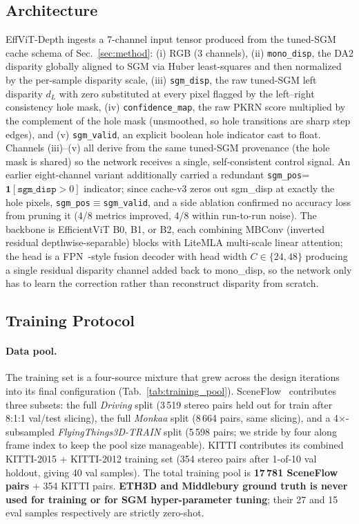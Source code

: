 \documentclass[journal]{IEEEtran}
\begin{document}
\subsection{Architecture}
\label{sec:effvit_arch}
EffViT-Depth ingests a 7-channel input tensor produced from the tuned-SGM cache schema of Sec.~\ref{sec:method}: (i) RGB (3 channels), (ii) \texttt{mono\_disp}, the DA2 disparity globally aligned to SGM via Huber least-squares and then normalized by the per-sample disparity scale, (iii) \texttt{sgm\_disp}, the raw tuned-SGM left disparity $d_L$ with zero substituted at every pixel flagged by the left--right consistency hole mask, (iv) \texttt{confidence\_map}, the raw PKRN score multiplied by the complement of the hole mask (unsmoothed, so hole transitions are sharp step edges), and (v) \texttt{sgm\_valid}, an explicit boolean hole indicator cast to float. Channels (iii)--(v) all derive from the same tuned-SGM provenance (the hole mask is shared) so the network receives a single, self-consistent control signal. An earlier eight-channel variant additionally carried a redundant \texttt{sgm\_pos}=$\mathbf{1}[\texttt{sgm\_disp}>0]$ indicator; since cache-v3 zeros out sgm\_disp at exactly the hole pixels, \texttt{sgm\_pos}$\equiv$\texttt{sgm\_valid}, and a side ablation confirmed no accuracy loss from pruning it (4/8 metrics improved, 4/8 within run-to-run noise). The backbone is EfficientViT B0, B1, or B2, each combining MBConv (inverted residual depthwise-separable) blocks with LiteMLA multi-scale linear attention; the head is a FPN~\cite{lin2017fpn}-style fusion decoder with head width $C\in\{24, 48\}$ producing a single residual disparity channel added back to mono\_disp, so the network only has to learn the correction rather than reconstruct disparity from scratch.

\subsection{Training Protocol}
\label{sec:training_protocol}

\paragraph{Data pool.} The training set is a four-source mixture that grew across the design iterations into its final configuration (Tab.~\ref{tab:training_pool}). SceneFlow~\cite{mayer2016sceneflow} contributes three subsets: the full \emph{Driving} split (3\,519 stereo pairs held out for train after 8:1:1 val/test slicing), the full \emph{Monkaa} split (8\,664 pairs, same slicing), and a 4$\times$-subsampled \emph{FlyingThings3D-TRAIN} split (5\,598 pairs; we stride by four along frame index to keep the pool size manageable). KITTI contributes its combined KITTI-2015 + KITTI-2012 training set (354 stereo pairs after 1-of-10 val holdout, giving 40 val samples). The total training pool is \textbf{17\,781 SceneFlow pairs} $+$ 354 KITTI pairs. \textbf{ETH3D and Middlebury ground truth is never used for training or for SGM hyper-parameter tuning}; their 27 and 15 eval samples respectively are strictly zero-shot.
\end{document}
